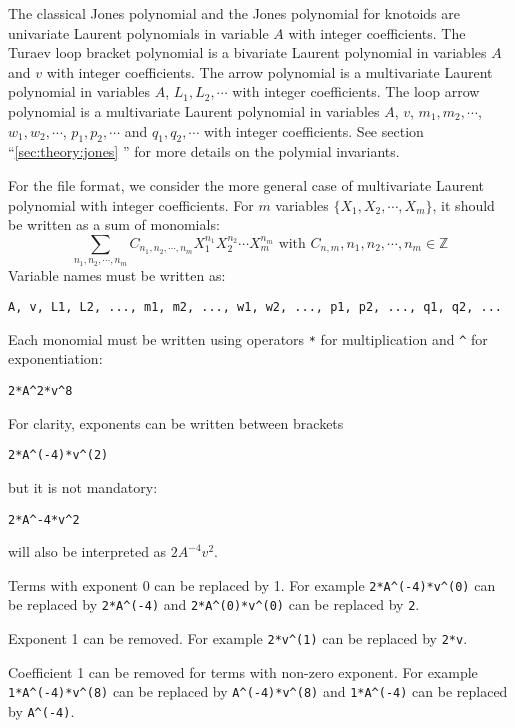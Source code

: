 The classical Jones polynomial and the Jones polynomial for knotoids are univariate Laurent polynomials in variable $A$ with integer coefficients.
The Turaev loop bracket polynomial is a bivariate Laurent polynomial in variables $A$ and $v$ with integer coefficients.
The arrow polynomial is a multivariate Laurent polynomial in variables $A$, $L_1, L_2,\cdots$ with integer coefficients.
The loop arrow polynomial is a multivariate Laurent polynomial in variables $A$, $v$, $m_1,m_2,\cdots$, $w_1,w_2,\cdots$, $p_1,p_2,\cdots$ and  $q_1,q_2,\cdots$ with integer coefficients.
See section ``\ref{sec:theory:jones} '' for more details on the polymial invariants.

For the file format, we consider the more general case of multivariate Laurent polynomial with integer coefficients. For $m$ variables $\{X_1,X_2,\cdots,X_m\}$, it should be written as a sum of monomials:
\[\sum_{n_1,n_2,\cdots,n_m} C_{n_1,n_2,\cdots,n_m}X_1^{n_1}X_2^{n_2}\cdots X_m^{n_m}\text{ with }C_{n,m},n_1,n_2,\cdots,n_m\in\mathbb Z \]
Variable names must be written as:
\begin{lstlisting}
A, v, L1, L2, ..., m1, m2, ..., w1, w2, ..., p1, p2, ..., q1, q2, ...
\end{lstlisting}


Each monomial must be written using operators \lstinline{*} for multiplication and  \lstinline{^} for exponentiation:
\begin{lstlisting}
2*A^2*v^8
\end{lstlisting}

For clarity, exponents can be written between brackets
\begin{lstlisting}
2*A^(-4)*v^(2)
\end{lstlisting}
but it is not mandatory:
\begin{lstlisting}
2*A^-4*v^2
\end{lstlisting}
will also be interpreted as $2A^{-4}v^{2}$.

Terms with exponent 0 can be replaced by 1. For example \lstinline{2*A^(-4)*v^(0)} can be replaced by \lstinline{2*A^(-4)} and  \lstinline{2*A^(0)*v^(0)} can be replaced by \lstinline{2}.

Exponent 1 can be removed. For example \lstinline{2*v^(1)} can be replaced by \lstinline{2*v}.

Coefficient 1 can be removed for terms with non-zero exponent. For example  \lstinline{1*A^(-4)*v^(8)} can be replaced by \lstinline{A^(-4)*v^(8)} and   \lstinline{1*A^(-4)} can be replaced by \lstinline{A^(-4)}.

